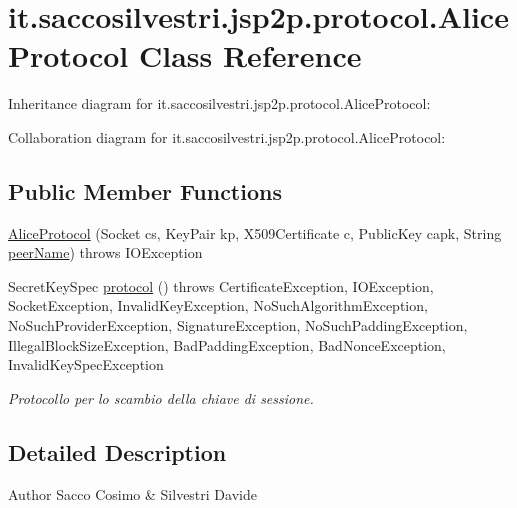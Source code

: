 \hypertarget{classit_1_1saccosilvestri_1_1jsp2p_1_1protocol_1_1_alice_protocol}{
\section{it.saccosilvestri.jsp2p.protocol.\-Alice\-Protocol \-Class \-Reference}
\label{classit_1_1saccosilvestri_1_1jsp2p_1_1protocol_1_1_alice_protocol}
}


\-Inheritance diagram for it.saccosilvestri.jsp2p.protocol.\-Alice\-Protocol\-:


\-Collaboration diagram for it.saccosilvestri.jsp2p.protocol.\-Alice\-Protocol\-:
\subsection*{\-Public \-Member \-Functions}
\begin{DoxyCompactItemize}
\item 
\hyperlink{classit_1_1saccosilvestri_1_1jsp2p_1_1protocol_1_1_alice_protocol_a544a579caa70d9ed601c5f557fb206e7}{\-Alice\-Protocol} (\-Socket cs, \-Key\-Pair kp, \-X509\-Certificate c, \-Public\-Key capk, \-String \hyperlink{classit_1_1saccosilvestri_1_1jsp2p_1_1protocol_1_1_protocol_a6dcf1366f63023a80091ab663ecd3060}{peer\-Name})  throws I\-O\-Exception 
\item 
\-Secret\-Key\-Spec \hyperlink{classit_1_1saccosilvestri_1_1jsp2p_1_1protocol_1_1_alice_protocol_a60cbfe1906bfbd7b95a7d21cec977843}{protocol} ()  throws Certificate\-Exception, I\-O\-Exception, 			\-Socket\-Exception, Invalid\-Key\-Exception, No\-Such\-Algorithm\-Exception, 			\-No\-Such\-Provider\-Exception, Signature\-Exception, 			\-No\-Such\-Padding\-Exception, Illegal\-Block\-Size\-Exception, 			\-Bad\-Padding\-Exception, Bad\-Nonce\-Exception, Invalid\-Key\-Spec\-Exception 
\begin{DoxyCompactList}\small\item\em \-Protocollo per lo scambio della chiave di sessione. \end{DoxyCompactList}\end{DoxyCompactItemize}


\subsection{\-Detailed \-Description}
\begin{DoxyAuthor}{\-Author}
\-Sacco \-Cosimo \& \-Silvestri \-Davide 
\end{DoxyAuthor}


